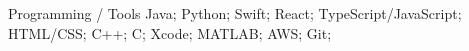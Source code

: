 

\begin{cvskills}

  \cvskill
    {Programming / Tools} %
    {Java; Python; Swift; React; TypeScript/JavaScript; HTML/CSS; C++; C; Xcode; MATLAB; AWS; Git;} %

\end{cvskills}